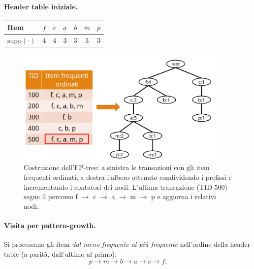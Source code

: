 \paragraph{Header table iniziale.}
\begin{center}
\begin{tabular}{@{}lcccccc@{}}
\toprule
Item & $f$ & $c$ & $a$ & $b$ & $m$ & $p$ \\
\midrule
$\mathrm{supp}(\cdot)$ & 4 & 4 & 3 & 3 & 3 & 3 \\
\bottomrule
\end{tabular}
\end{center}

\begin{figure}[htbp]
  \centering
  \includegraphics[width=0.92\textwidth]{images/fp-growth-complete.png}
  \caption{Costruzione dell’FP-tree: a sinistra le transazioni con gli item frequenti ordinati; a destra l’albero ottenuto condividendo i prefissi e incrementando i contatori dei nodi. L’ultima transazione (TID 500) segue il percorso f $\rightarrow$ c $\rightarrow$ a $\rightarrow$ m $\rightarrow$ p e aggiorna i relativi nodi.}
  \label{fig:fp-growth-complete}
\end{figure}

\paragraph{Visita per pattern-growth.}
Si processano gli item \emph{dal meno frequente al pi\`u frequente} nell’ordine della header table (a parit\`a, dall’ultimo al primo):
\[
p \rightarrow m \rightarrow b \rightarrow a \rightarrow c \rightarrow f.
\]

